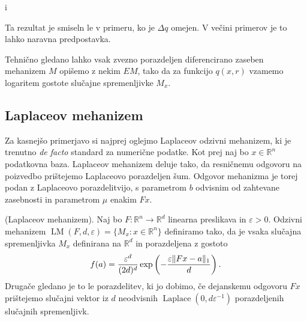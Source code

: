 i\documentclass[mat1]{fmfdelo}
\DeclarePairedDelimiter{\norm}{\lVert}{\rVert}
\newcommand{\R}{\mathbb R}
\newcommand{\query}{F: \R^n \to \R^d}
\begin{document}
\begin{opomba}
Ta rezultat je smiseln le v primeru, ko je $\Delta q$ omejen. V večini primerov je to lahko naravna predpostavka.
\end{opomba}

\begin{opomba}
    Tehnično gledano lahko vsak zvezno porazdeljen diferencirano zaseben mehanizem $M$ opišemo z nekim $EM$, tako da za funkcijo $q(x, r)$ vzamemo logaritem gostote slučajne spremenljivke $M_x$.
\end{opomba}

\subsection{Laplaceov mehanizem}

Za kasnejšo primerjavo si najprej oglejmo Laplaceov odzivni mehanizem, ki je trenutno {\em de facto} standard za numerične podatke. Kot prej naj bo $x \in \R^n$ podatkovna baza. Laplaceov mehanizem deluje tako, da resničnemu odgovoru na poizvedbo prištejemo Laplaceovo porazdeljen šum. Odgovor mehanizma je torej podan z Laplaceovo porazdelitvijo, s parametrom $b$ odvisnim od zahtevane zasebnosti in parametrom $\mu$ enakim $Fx$.

\begin{definicija}
    (Laplaceov mehanizem). Naj bo $\query$ linearna preslikava in $\varepsilon > 0$. Odzivni mehanizem $\operatorname{LM}(F, d, \varepsilon) = \{M_x: x\in \R^n\}$ definiramo tako, da je vsaka slučajna spremenljivka $M_x$ definirana na $\R^d$ in porazdeljena z gostoto
    \begin{equation*}
        f(a) = \frac{\varepsilon^d}{(2d)^d} \exp \left(-\frac{\varepsilon \norm{Fx-a}_1}{d} \right).
    \end{equation*}
    Drugače gledano je to le porazdelitev, ki jo dobimo, če dejanskemu odgovoru $Fx$ prištejemo slučajni vektor iz $d$ neodvisnih $\operatorname{Laplace}(0, d \varepsilon^{-1})$ porazdeljenih slučajnih spremenljivk.
\end{definicija}
\end{document}

